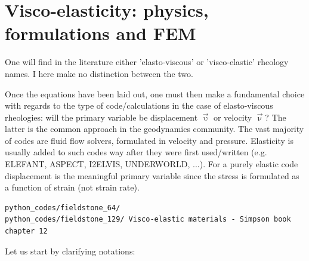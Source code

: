 \chapter{Visco-elasticity: physics, formulations and FEM } %

One will find in the literature either 'elasto-viscous' or 'visco-elastic' rheology names.
I here make no distinction between the two.

Once the equations have been laid out, one must then make a fundamental choice 
with regards to the type of code/calculations in the case of elasto-viscous
rheologies: will the primary variable be displacement $\vec{\upupsilon}$ or velocity $\vec\upnu$?
The latter is the common approach in the geodynamics community. The vast majority
of codes are fluid flow solvers, formulated in velocity and pressure. 
Elasticity is usually added to such codes way after they were first used/written 
(e.g. ELEFANT, ASPECT, I2ELVIS, UNDERWORLD, ...). 
For a purely elastic code displacement is the meaningful primary variable since the stress 
is formulated as a function of strain (not strain rate). 

\begin{verbatim}
python_codes/fieldstone_64/
python_codes/fieldstone_129/ Visco-elastic materials - Simpson book chapter 12
\end{verbatim}

Let us start by clarifying notations:

